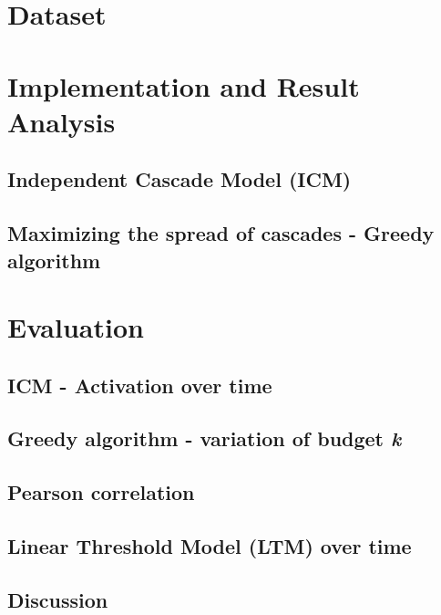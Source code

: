\section{Dataset}

\section{Implementation and Result Analysis}

\subsection{Independent Cascade Model (ICM)}

\subsection{Maximizing the spread of cascades - Greedy algorithm}

\section{Evaluation}

\subsection{ICM - Activation over time}

\subsection{Greedy algorithm - variation of budget \textit{k}}

\subsection{Pearson correlation}

\subsection{Linear Threshold Model (LTM) over time}

\subsection{Discussion}